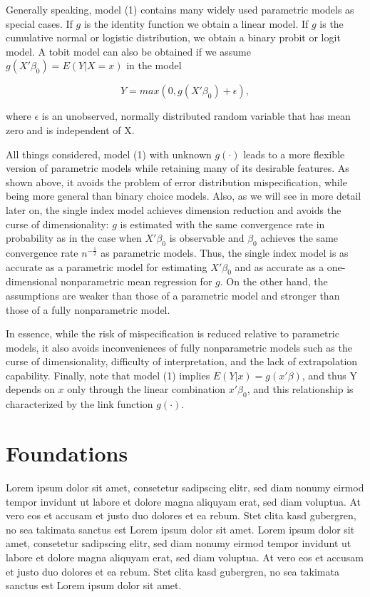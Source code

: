 \documentclass[a4paper]{article}
\begin{document}
Generally speaking, model (1) contains many widely used parametric models as special cases. If $g$ is the identity function we obtain a linear model. If $g$ is the cumulative normal or logistic distribution, we obtain a binary probit or logit model.
A tobit model can also be obtained if we assume $g(X'\beta_0) = E(Y|X=x)$ in the model


\[
    Y = max (0, g(X'\beta_0) + \epsilon),
\]

where $\epsilon$ is an unobserved, normally distributed random variable that has mean zero and is independent of X. 

All things considered, model (1) with unknown $g(\cdot)$ leads to a more flexible version of parametric models while retaining many of its desirable features. As shown above, it avoids the problem of error distribution mispecification, while being more general than binary choice models. Also, as we will see in more detail later on, the single index model achieves dimension reduction and avoids the curse of dimensionality: $g$ is estimated with the same convergence rate in probability as in the case when $X'\beta_0$ is observable and $\beta_0$ achieves the same convergence rate $n^{-\frac{1}{2}}$ as parametric models. Thus, the single index model is as accurate as a parametric model for estimating $X'\beta_0$ and as accurate as a one-dimensional nonparametric mean regression for $g$. On the other hand, the assumptions are weaker than those of a parametric model and stronger than those of a fully nonparametric model. 

\vspace{5mm} 

In essence, while the risk of mispecification is reduced relative to parametric models, it also avoids inconveniences of fully nonparametric models such as the curse of dimensionality, difficulty of interpretation, and the lack of extrapolation capability. Finally, note that model (1) implies $E(Y|x) = g(x'\beta)$, and thus Y depends on $x$ only through the linear combination $x'\beta_0$, and this relationship is characterized by the link function $g(\cdot)$.  %



\section{Foundations} %
\label{sec:foundations}
Lorem ipsum dolor sit amet, consetetur sadipscing elitr, sed diam nonumy eirmod tempor invidunt ut labore et dolore magna aliquyam erat, sed diam voluptua. At vero eos et accusam et justo duo dolores et ea rebum. Stet clita kasd gubergren, no sea takimata sanctus est Lorem ipsum dolor sit amet. Lorem ipsum dolor sit amet, consetetur sadipscing elitr, sed diam nonumy eirmod tempor invidunt ut labore et dolore magna aliquyam erat, sed diam voluptua. At vero eos et accusam et justo duo dolores et ea rebum. Stet clita kasd gubergren, no sea takimata sanctus est Lorem ipsum dolor sit amet.
\end{document}
